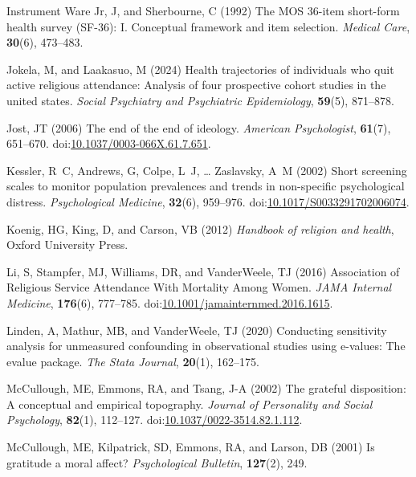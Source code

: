 \documentclass[
  single column]{article}
\newlength{\cslhangindent}
\newenvironment{CSLReferences}[2] %
 {\begin{list}{}{%
  \setlength{\itemindent}{0pt}
  \setlength{\leftmargin}{0pt}
  \setlength{\parsep}{0pt}
  \ifodd #1
   \setlength{\leftmargin}{\cslhangindent}
   \setlength{\itemindent}{-1\cslhangindent}
  \fi
  \setlength{\itemsep}{#2\baselineskip}}}
 {\end{list}}
\begin{document}
\begin{CSLReferences}{1}{0}
Instrument Ware Jr, J, and Sherbourne, C (1992) The MOS 36-item
short-form health survey (SF-36): I. Conceptual framework and item
selection. \emph{Medical Care}, \textbf{30}(6), 473--483.

Jokela, M, and Laakasuo, M (2024) Health trajectories of individuals who
quit active religious attendance: Analysis of four prospective cohort
studies in the united states. \emph{Social Psychiatry and Psychiatric
Epidemiology}, \textbf{59}(5), 871--878.

Jost, JT (2006) The end of the end of ideology. \emph{American
Psychologist}, \textbf{61}(7), 651--670.
doi:\href{https://doi.org/10.1037/0003-066X.61.7.651}{10.1037/0003-066X.61.7.651}.

Kessler, R~C, Andrews, G, Colpe, L~J, \ldots{} Zaslavsky, A~M (2002)
Short screening scales to monitor population prevalences and trends in
non-specific psychological distress. \emph{Psychological Medicine},
\textbf{32}(6), 959--976.
doi:\href{https://doi.org/10.1017/S0033291702006074}{10.1017/S0033291702006074}.

Koenig, HG, King, D, and Carson, VB (2012) \emph{Handbook of religion
and health}, Oxford University Press.

Li, S, Stampfer, MJ, Williams, DR, and VanderWeele, TJ (2016)
{Association of Religious Service Attendance With Mortality Among
Women}. \emph{JAMA Internal Medicine}, \textbf{176}(6), 777--785.
doi:\href{https://doi.org/10.1001/jamainternmed.2016.1615}{10.1001/jamainternmed.2016.1615}.

Linden, A, Mathur, MB, and VanderWeele, TJ (2020) Conducting sensitivity
analysis for unmeasured confounding in observational studies using
e-values: The evalue package. \emph{The Stata Journal}, \textbf{20}(1),
162--175.

McCullough, ME, Emmons, RA, and Tsang, J-A (2002) The grateful
disposition: A conceptual and empirical topography. \emph{Journal of
Personality and Social Psychology}, \textbf{82}(1), 112--127.
doi:\href{https://doi.org/10.1037/0022-3514.82.1.112}{10.1037/0022-3514.82.1.112}.

McCullough, ME, Kilpatrick, SD, Emmons, RA, and Larson, DB (2001) Is
gratitude a moral affect? \emph{Psychological Bulletin},
\textbf{127}(2), 249.


\end{CSLReferences}
\end{document}
